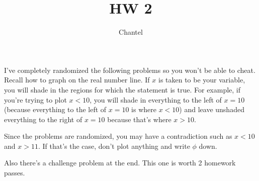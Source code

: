 \documentclass[12pt]{article}
\begin{document}
			\title{HW 2}
			\author{Chantel}
			\date{}
			\maketitle
I've completely randomized the following problems so you won't be able to cheat. Recall how to 
graph on the real number line. If $x$ is taken
to be your variable, you will shade in the regions for which the statement is true. For example, if you're
trying to plot $x < 10$, you will shade in everything to the left of $x = 10$ (because everything to the 
left of $x = 10$ is where $x < 10$) and leave unshaded everything to the right of $x = 10$ because that's where
$x > 10$.

Since the problems are randomized, you may have a contradiction such as $x < 10$ and $x > 11$. If that's the case,
don't plot anything and write $\phi$ down.

Also there's a challenge problem at the end. This one is worth 2 homework passes.
\end{document}
